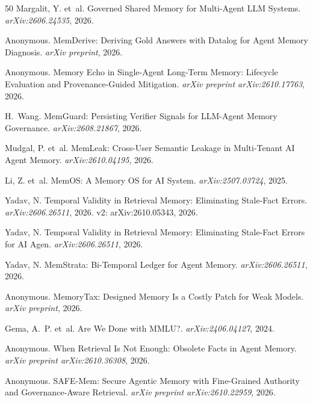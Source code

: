 \documentclass[sigconf,nonacm]{acmart}
\begin{document}
\begin{thebibliography}{50}
Margalit, Y. et~al.
\newblock Governed Shared Memory for Multi-Agent LLM Systems. \newblock \emph{arXiv:2606.24535}, 2026.

Anonymous.
\newblock MemDerive: Deriving Gold Answers with Datalog for Agent Memory Diagnosis.
\newblock \emph{arXiv preprint}, 2026.

Anonymous.
\newblock Memory Echo in Single-Agent Long-Term Memory: Lifecycle Evaluation and Provenance-Guided Mitigation.
\newblock \emph{arXiv preprint arXiv:2610.17763}, 2026.

H.~Wang.
\newblock MemGuard: Persisting Verifier Signals for LLM-Agent Memory Governance. \newblock \emph{arXiv:2608.21867}, 2026.

Mudgal, P. et~al.
\newblock MemLeak: Cross-User Semantic Leakage in Multi-Tenant AI Agent Memory.
\newblock \emph{arXiv:2610.04195}, 2026.

Li, Z. et~al.
\newblock MemOS: A Memory OS for AI System. \newblock \emph{arXiv:2507.03724}, 2025.

Yadav, N.
\newblock Temporal Validity in Retrieval Memory: Eliminating Stale-Fact Errors.
\newblock \emph{arXiv:2606.26511}, 2026. v2: arXiv:2610.05343, 2026.

Yadav, N.
\newblock Temporal Validity in Retrieval Memory: Eliminating Stale-Fact Errors for AI Agen. \newblock \emph{arXiv:2606.26511}, 2026.

Yadav, N.
\newblock MemStrata: Bi-Temporal Ledger for Agent Memory.
\newblock \emph{arXiv:2606.26511}, 2026.

Anonymous.
\newblock MemoryTax: Designed Memory Is a Costly Patch for Weak Models.
\newblock \emph{arXiv preprint}, 2026.

Gema, A.~P. et~al.
\newblock Are We Done with MMLU?. \newblock \emph{arXiv:2406.04127}, 2024.

Anonymous.
\newblock When Retrieval Is Not Enough: Obsolete Facts in Agent Memory.
\newblock \emph{arXiv preprint arXiv:2610.36308}, 2026.

Anonymous.
\newblock SAFE-Mem: Secure Agentic Memory with Fine-Grained Authority and Governance-Aware Retrieval.
\newblock \emph{arXiv preprint arXiv:2610.22959}, 2026.


\end{thebibliography}
\end{document}

